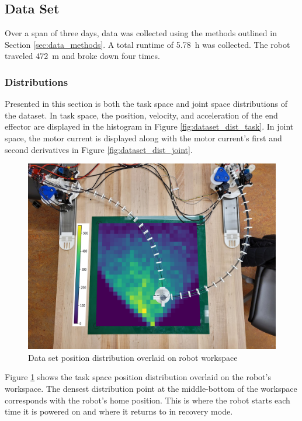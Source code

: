 \subsection{Data Set}
Over a span of three days, data was collected using the methods outlined in Section \ref{sec:data_methods}. A total runtime of \SI{5.78}{h} was collected. The robot traveled \SI{472}{m} and broke down four times. 

\subsubsection{Distributions}
Presented in this section is both the task space and joint space distributions of the dataset. In task space, the position, velocity, and acceleration of the end effector are displayed in the histogram in Figure \ref{fig:dataset_dist_task}. In joint space, the motor current is displayed along with the motor current's first and second derivatives in Figure \ref{fig:dataset_dist_joint}. 

\begin{figure}[h]
    \centering
    \includegraphics[width=\textwidth]{images/dataset_overlay.png}
    \caption{Data set position distribution overlaid on robot workspace}
    \label{fig:dataset_overlay}
\end{figure}

Figure \ref{fig:dataset_overlay} shows the task space position distribution overlaid on the robot's workspace. The densest distribution point at the middle-bottom of the workspace corresponds with the robot's home position. This is where the robot starts each time it is powered on and where it returns to in recovery mode. 

